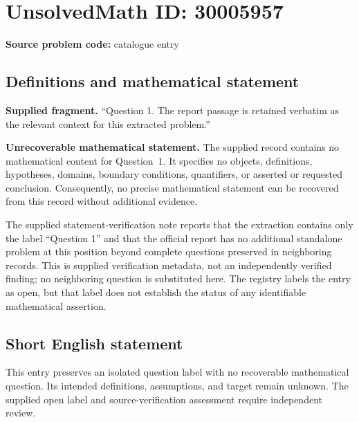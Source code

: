 \documentclass[11pt]{article}
\begin{document}
\section*{UnsolvedMath ID: 30005957}
\textbf{Source problem code:} catalogue entry
\subsection{Definitions and mathematical statement}
\textbf{Supplied fragment.} ``Question 1. The report passage is retained verbatim as the relevant context for this extracted problem.''

\textbf{Unrecoverable mathematical statement.} The supplied record contains no mathematical content for Question~1. It specifies no objects, definitions, hypotheses, domains, boundary conditions, quantifiers, or asserted or requested conclusion. Consequently, no precise mathematical statement can be recovered from this record without additional evidence.

The supplied statement-verification note reports that the extraction contains only the label ``Question 1'' and that the official report has no additional standalone problem at this position beyond complete questions preserved in neighboring records. This is supplied verification metadata, not an independently verified finding; no neighboring question is substituted here. The registry labels the entry as open, but that label does not establish the status of any identifiable mathematical assertion.
\subsection{Short English statement}
This entry preserves an isolated question label with no recoverable mathematical question. Its intended definitions, assumptions, and target remain unknown. The supplied open label and source-verification assessment require independent review.
\end{document}
